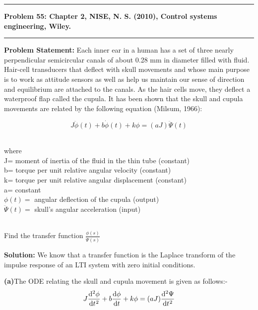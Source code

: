 \documentclass[15.7pt]{article}
\newcommand\question[2]{\vspace{.25in}\hrule\textbf{#1: #2}\vspace{.5em}\hrule\vspace{.10in}}
\renewcommand\part[1]{\vspace{.10in}\textbf{(#1)}}
\newcommand\problem{\vspace{.10in}\textbf{Problem Statement: }}
\newcommand\solution{\vspace{.10in}\textbf{Solution: }}
\begin{document}
\raggedright

\newcommand\NAME{Soham Kulkarni}  
\newcommand\ROLLNO{EE19BTECH11053}    
\newcommand\ASSIGNMENT{1}             

\question{Problem 55}{Chapter 2, NISE, N. S. (2010), Control systems engineering, Wiley.} 
 \problem{Each inner ear in a human has a set of three nearly
perpendicular semicircular canals of about 0.28 mm
in diameter filled with fluid. Hair-cell transducers that deflect with skull movements and whose main purpose is to work as attitude sensors as well as help
us maintain our sense of direction and equilibrium
are attached to the canals. As the hair cells move,
they deflect a waterproof flap called the cupula. It
has been shown that the skull and cupula movements are related by the following equation (Milsum, 1966):}
\begin{center}
      \[ J\ddot \phi (t) + b\dot \phi (t) + k\phi = (aJ)\ddot\Psi (t) \]
\end{center}

    \begin{flushleft}
    \\where 
    \smallskip
    \\J= moment of inertia of the fluid in the thin tube (constant)
    \\b= torque per unit relative angular velocity (constant)
    \\k= torque per unit relative angular displacement (constant)
    \\a= constant
    \\$\phi(t)=$ angular deflection of the cupula (output) 
    \\$\ddot\Psi (t) =$ skull’s angular acceleration (input) 
    \end{flushleft}
    \bigskip
    \\ Find the transfer function \(\frac{\phi (s)}{\ddot\Psi (s)}\) 
  
\solution{We know that a transfer function is the Laplace transform of the impulse response of an LTI system with zero initial conditions.} 

\part{a}The ODE relating the skull and cupula movement is given as follows:-
\begin{equation}
       J\diff[2]\phi t + b\diff \phi t + k\phi = (aJ)\diff[2]\Psi t
   \end{equation}
\end{document}
